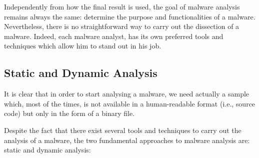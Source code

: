 \documentclass[LaM,binding=0.6cm]{sapthesis}
\begin{document}
Independently from how the final result is used, the goal of malware analysis remains always the same: determine the purpose and functionalities of a malware. Nevertheless, there is no straightforward way to carry out the dissection of a malware. Indeed, each malware analyst, has its own preferred tools and techniques which allow him to stand out in his job.

\subsection{Static and Dynamic Analysis}
It is clear that in order to start analysing a malware, we need actually a sample which, most of the times, is not available in a human-readable format (i.e., source code) but only in the form of a binary file.

Despite the fact that there exist several tools and techniques to carry out the analysis of a malware, the two fundamental approaches to malware analysis are: static and dynamic analysis: 
\end{document}

